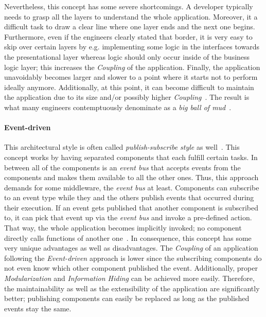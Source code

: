\documentclass[12pt,a4paper]{report}
\begin{document}
Nevertheless, this concept has some severe shortcomings.
A developer typically needs to grasp all the layers to understand the whole application.
Moreover, it a difficult task to draw a clear line where one layer ends and the
next one begins.
Furthermore, even if the engineers clearly stated that border,
it is very easy to skip over certain layers by e.g. implementing some logic
in the interfaces towards the presentational layer whereas logic should only occur
inside of the business logic layer; this increases the \textit{Coupling} of the application.
Finally, the application unavoidably becomes larger and slower to a point
where it starts not to perform ideally anymore.
Additionally, at this point, it can become difficult to maintain the application due
to its size and/or possibly higher \textit{Coupling}~\cite{richards-sa-patterns}.
The result is what many engineers contemptuously denominate
as a \textit{big ball of mud}~\cite{fairbanks-sa}.

\paragraph{Event-driven}
This architectural style is often called \textit{publish-subscribe style} as well~\cite{fairbanks-sa}.
This concept works by having separated components that each fulfill certain tasks.
In between all of the components is an \textit{event bus} that accepts events from
the components and makes them available to all the other ones. Thus, this approach
demands for some middleware, the \textit{event bus} at least.
Components can subscribe to an event type while they and the others publish events
that occurred during their execution. If an event gets published that another component
is subscribed to, it can pick that event up via the \textit{event bus} and invoke
a pre-defined action. That way, the whole application becomes implicitly invoked;
no component directly calls functions of another one~\cite{garlan-shaw-sa}.
In consequence, this concept has some very unique advantages as well as disadvantages.
The \textit{Coupling} of an application following the \textit{Event-driven} approach
is lower since the subscribing components do not even know which other component
published the event. Additionally, proper \textit{Modularization} and \textit{Information Hiding}
can be achieved more easily. Therefore, the maintainability as well as the extensibility
of the application are significantly better; publishing components can easily be replaced
as long as the published events stay the same.
\end{document}
